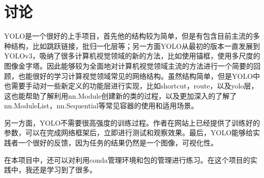 \section{讨论}
\label{discussion}

YOLO是一个很好的上手项目，首先他的结构较为简单，但是有包含目前主流的多种结构，比如跳跃链接，批归一化层等；另一方面YOLO从最初的版本一直发展到YOLOv3，吸纳了很多计算机视觉领域的新的方法，比如使用锚框，使用多尺度的图像金字塔。因此能够较为全面地对计算机视觉领域主流的方法进行一个简要的回顾，也能很好的学习计算视觉领域常见的网络结构。虽然结构简单，但是YOLO中也需要手动对一些新定义的功能层进行实现，比如shortcut，route，以及yolo层，这也能帮助了解利用nn.Module创建新的类的过程，以及更加深入的了解了nn.ModuleList，nn.Sequential等常见容器的使用和适用场景。

另一方面，YOLO不需要很高强度的训练过程。作者在网站上已经提供了训练好的参数，可以在完成网络框架后，立即进行测试和观察效果。最后，YOLO能够给实践者一个很好的反馈，因为任务的结果仍然是一个图像，可视化性。

在本项目中，还可以对利用conda管理环境和包的管理进行练习。在这个项目的实践中，我还是学习到了很多。